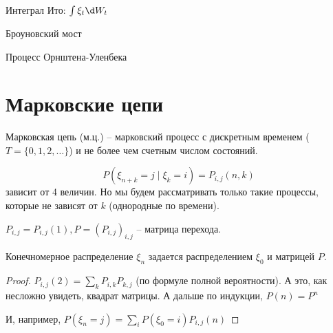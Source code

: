 Интеграл Ито: $\int \xi_t \d W_t$ \TODO

\TODO Броуновский мост

\TODO Процесс Орнштена-Уленбека


\section{Марковские цепи}
\begin{Def}
Марковская цепь (м.ц.) -- марковский процесс с дискретным временем ($T = \{0, 1, 2, \dots \}$) и не более чем счетным числом состояний.
\end{Def}

$$P(\xi_{n+k} = j \mid \xi_k = i) = P_{i, j}(n, k)$$ зависит от 4 величин. Но мы будем рассматривать только такие процессы, которые не зависят от $k$ (однородные по времени).

\begin{Def}
$P_{i,j} = P_{i,j}(1), P = (P_{i, j})_{i, j}$ -- матрица перехода.
\end{Def}
\begin{theorem}
Конечномерное распределение $\xi_n$ задается распределением $\xi_0$ и матрицей $P$.
\end{theorem}
\begin{proof}
$P_{i,j}(2) = \sum\limits_k P_{i,k} P_{k, j}$ (по формуле полной вероятности). А это, как несложно увидеть, квадрат матрицы.
А дальше по индукции, $P(n) = P^n$

И, например, $P(\xi_n = j) = \sum\limits_i P(\xi_0 = i) P_{i,j}(n)$
\end{proof}
